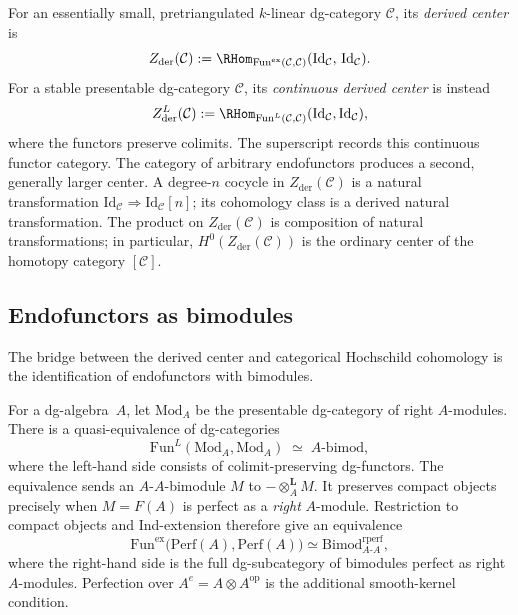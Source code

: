 \begin{definition}
\label{def:derived-center}
For an essentially small, pretriangulated $k$-linear dg-category
$\mathcal C$, its \emph{derived center} is
\[
Z_{\mathrm{der}}(\mathcal{C})
:= \RHom_{\mathrm{Fun}^{\mathrm{ex}}(\mathcal{C}, \mathcal{C})}
 (\mathrm{Id}_{\mathcal{C}},\, \mathrm{Id}_{\mathcal{C}}).
\]
For a stable presentable dg-category $\mathcal C$, its
\emph{continuous derived center} is instead
\[
 Z_{\mathrm{der}}^{L}(\mathcal C)
 :=\RHom_{\mathrm{Fun}^{L}(\mathcal C,\mathcal C)}
 (\mathrm{Id}_{\mathcal C},\mathrm{Id}_{\mathcal C}),
\]
where the functors preserve colimits.  The superscript records this
continuous functor category.  The category of arbitrary endofunctors
produces a second, generally larger center.
A degree-$n$ cocycle in $Z_{\mathrm{der}}(\mathcal{C})$ is a
natural transformation $\mathrm{Id}_{\mathcal{C}} \Rightarrow
\mathrm{Id}_{\mathcal{C}}[n]$; its cohomology class is a derived
natural transformation. The product on $Z_{\mathrm{der}}(\mathcal{C})$
is composition of natural transformations; in particular,
$H^0(Z_{\mathrm{der}}(\mathcal{C}))$ is the ordinary center of the
homotopy category $[\mathcal{C}]$.
\end{definition}

\subsection{Endofunctors as bimodules}

The bridge between the derived center and categorical Hochschild
cohomology is the identification of endofunctors with bimodules.

\begin{proposition}
\label{prop:endofunctor-bimodule}
For a dg-algebra~$A$, let $\mathrm{Mod}_A$ be the presentable
dg-category of right $A$-modules.  There is a quasi-equivalence of
dg-categories
\[
\mathrm{Fun}^{L}(\mathrm{Mod}_A,\mathrm{Mod}_A)
\;\simeq\; A\text{-}\mathrm{bimod},
\]
where the left-hand side consists of colimit-preserving dg-functors.
The equivalence sends an $A$-$A$-bimodule $M$ to
$- \otimes_A^{\mathbf{L}} M$.  It preserves compact objects precisely
when $M=F(A)$ is perfect as a \emph{right} $A$-module.  Restriction to
compact objects and Ind-extension therefore give an equivalence
\[
 \mathrm{Fun}^{\mathrm{ex}}\bigl(\mathrm{Perf}(A),
       \mathrm{Perf}(A)\bigr)
 \simeq
 \mathrm{Bimod}_{A\text{-}A}^{\mathrm{rperf}},
\]
where the right-hand side is the full dg-subcategory of bimodules
perfect as right $A$-modules.  Perfection over
$A^e=A\otimes A^{\mathrm{op}}$ is the additional smooth-kernel
condition.
\end{proposition}

